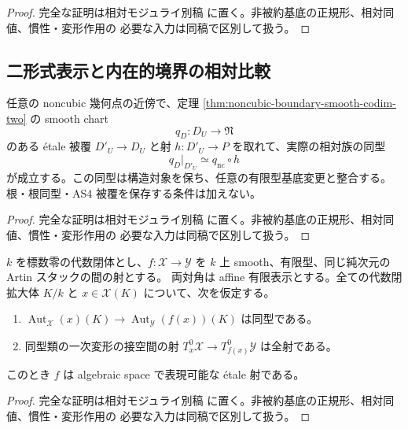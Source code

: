 \begin{proof}
完全な証明は相対モジュライ別稿
\cite[noncubic 境界の相対表示とモジュライ写像]{QuadricModuli2026}
に置く。非被約基底の正規形、相対同値、慣性・変形作用の
必要な入力は同稿で区別して扱う。
\end{proof}

\subsection{二形式表示と内在的境界の相対比較}

\begin{lemma}
\label{lem:noncubic-boundary-chart-factorization}
任意の noncubic 幾何点の近傍で、定理
\ref{thm:noncubic-boundary-smooth-codim-two} の smooth chart
\[
 q_D:D_U\longrightarrow\mathfrak N
\]
のある \texorpdfstring{\'etale}{etale} 被覆 $D'_U\to D_U$ と射
$h:D'_U\to P$ を取れて、実際の相対族の同型
\[
 q_D|_{D'_U}\simeq q_{\mathrm{nc}}\circ h
 \tag{NC-chart-factor}\label{eq:noncubic-boundary-chart-factorization}
\]
が成立する。この同型は構造対象を保ち、任意の有限型基底変更と整合する。
根・根同型・AS4 被覆を保存する条件は加えない。
\end{lemma}
\begin{proof}
完全な証明は相対モジュライ別稿
\cite[noncubic 境界の相対表示とモジュライ写像]{QuadricModuli2026}
に置く。非被約基底の正規形、相対同値、慣性・変形作用の
必要な入力は同稿で区別して扱う。
\end{proof}

\begin{lemma}
\label{lem:smooth-stack-etale-tangent-comparison}
$k$ を標数零の代数閉体とし、$f:\mathcal X\to\mathcal Y$ を
$k$ 上 smooth、有限型、同じ純次元の Artin スタックの間の射とする。
両対角は affine 有限表示とする。全ての代数閉拡大体 $K/k$ と
$x\in\mathcal X(K)$ について、次を仮定する。
\begin{enumerate}
\item $\operatorname{Aut}_{\mathcal X}(x)(K)\to
  \operatorname{Aut}_{\mathcal Y}(f(x))(K)$ は同型である。
\item 同型類の一次変形の接空間の射
  $T^0_x\mathcal X\to T^0_{f(x)}\mathcal Y$ は全射である。
\end{enumerate}
このとき $f$ は algebraic space で表現可能な \texorpdfstring{\'etale}{etale} 射である。
\end{lemma}
\begin{proof}
完全な証明は相対モジュライ別稿
\cite[noncubic 境界の相対表示とモジュライ写像]{QuadricModuli2026}
に置く。非被約基底の正規形、相対同値、慣性・変形作用の
必要な入力は同稿で区別して扱う。
\end{proof}

